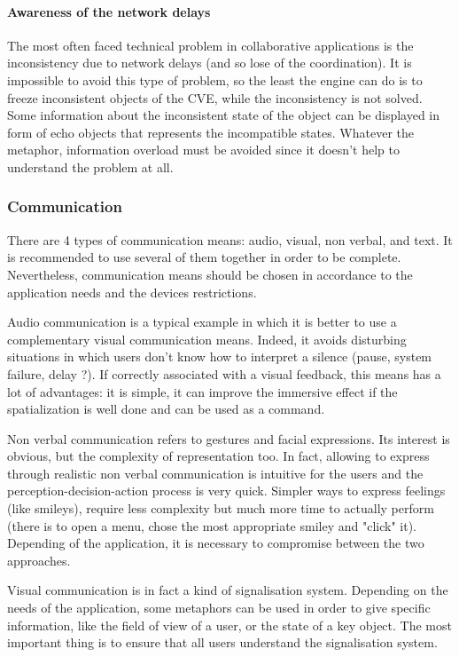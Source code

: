 \documentclass[a4paper]{article}
\begin{document}
\paragraph{Awareness of the network delays}
The most often faced technical problem in collaborative applications is the inconsistency due to network delays (and so lose of the coordination). It is impossible to avoid this type of problem, so the least the engine can do is to freeze inconsistent objects of the CVE, while the inconsistency is not solved. Some information about the inconsistent state of the object can be displayed in form of echo objects that represents the incompatible states. Whatever the metaphor, information overload must be avoided since it doesn't help to understand the problem at all.

\subsubsection{Communication}

There are 4 types of communication means: audio, visual, non verbal, and text. It is recommended to use several of them together in order to be complete. Nevertheless, communication means should be chosen in accordance to the application needs and the devices restrictions.

Audio communication is a typical example in which it is better to use a complementary visual communication means. Indeed, it avoids disturbing situations in which users don't know how to interpret a silence (pause, system failure, delay ?). If correctly associated with a visual feedback, this means has a lot of advantages: it is simple, it can improve the immersive effect if the spatialization is well done and can be used as a command.

Non verbal communication refers to gestures and facial expressions. Its interest is obvious, but the complexity of representation too. In fact, allowing to express through realistic non verbal communication is intuitive for the users and the perception-decision-action process is very quick. Simpler ways to express feelings (like smileys), require less complexity but much more time to actually perform (there is to open a menu, chose the most appropriate smiley and "click" it). Depending of the application, it is necessary to compromise between the two approaches.

Visual communication is in fact a kind of signalisation system. Depending on the needs of the application, some metaphors can be used in order to give specific information, like the field of view of a user, or the state of a key object. The most important thing is to ensure that all users understand the signalisation system.
\end{document}
